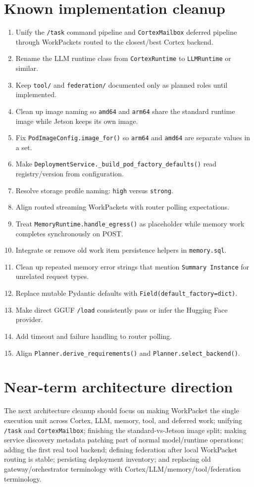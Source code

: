 \documentclass[11pt,a4paper]{article}
\begin{document}
\section{Known implementation cleanup}
\begin{enumerate}[leftmargin=1.3em]
  \item Unify the \texttt{/task} command pipeline and \texttt{CortexMailbox} deferred pipeline through WorkPackets routed to the closest/best Cortex backend.
  \item Rename the LLM runtime class from \texttt{CortexRuntime} to \texttt{LLMRuntime} or similar.
  \item Keep \texttt{tool/} and \texttt{federation/} documented only as planned roles until implemented.
  \item Clean up image naming so \texttt{amd64} and \texttt{arm64} share the standard runtime image while Jetson keeps its own image.
  \item Fix \texttt{PodImageConfig.image\_for()} so \texttt{arm64} and \texttt{amd64} are separate values in a set.
  \item Make \texttt{DeploymentService.\_build\_pod\_factory\_defaults()} read registry/version from configuration.
  \item Resolve storage profile naming: \texttt{high} versus \texttt{strong}.
  \item Align routed streaming WorkPackets with router polling expectations.
  \item Treat \texttt{MemoryRuntime.handle\_egress()} as placeholder while memory work completes synchronously on POST.
  \item Integrate or remove old work item persistence helpers in \texttt{memory.sql}.
  \item Clean up repeated memory error strings that mention \texttt{Summary Instance} for unrelated request types.
  \item Replace mutable Pydantic defaults with \texttt{Field(default\_factory=dict)}.
  \item Make direct GGUF \texttt{/load} consistently pass or infer the Hugging Face provider.
  \item Add timeout and failure handling to router polling.
  \item Align \texttt{Planner.derive\_requirements()} and \texttt{Planner.select\_backend()}.
\end{enumerate}

\section{Near-term architecture direction}
The next architecture cleanup should focus on making WorkPacket the single execution unit across Cortex, LLM, memory, tool, and deferred work; unifying \texttt{/task} and \texttt{CortexMailbox}; finishing the standard-vs-Jetson image split; making service discovery metadata patching part of normal model/runtime operations; adding the first real tool backend; defining federation after local WorkPacket routing is stable; persisting deployment inventory; and replacing old gateway/orchestrator terminology with Cortex/LLM/memory/tool/federation terminology.
\end{document}
